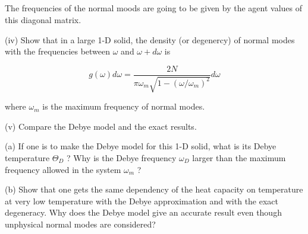 \documentclass[12pt]{article}
\begin{document}
\subsection{}
The frequencies of the normal moods are going to be given by the agent values of this diagonal matrix.

(iv) Show that in a large 1-D solid, the density (or degenercy) of normal modes with the frequencies between $\omega$ and $\omega+d \omega$ is


\begin{equation*}
g(\omega) d \omega=\frac{2 N}{\pi \omega_{m} \sqrt{1-\left(\omega / \omega_{m}\right)^{2}}} d \omega \tag{10}
\end{equation*}


where $\omega_{m}$ is the maximum frequency of normal modes.

(v) Compare the Debye model and the exact results.

(a) If one is to make the Debye model for this 1-D solid, what is its Debye temperature $\Theta_{D}$ ? Why is the Debye frequency $\omega_{D}$ larger than the maximum frequency allowed in the system $\omega_{m}$ ?

(b) Show that one gets the same dependency of the heat capacity on temperature at very low temperature with the Debye approximation and with the exact degeneracy. Why does the Debye model give an accurate result even though unphysical normal modes are considered?
\end{document}
